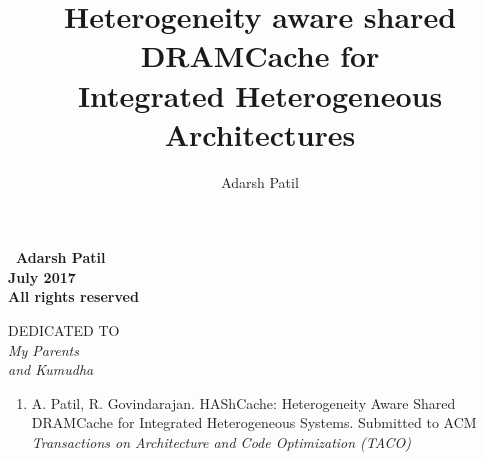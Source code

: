 \documentclass[12pt,twoside,a4paper, openright]{report}
\newcommand{\cachename}{HAShCache}
\begin{document}
\begin{frontmatter}
\title{Heterogeneity aware shared DRAMCache for \\ Integrated Heterogeneous Architectures}
\author{Adarsh Patil}
\enggfaculty
\mscengg
\iisclogotrue %
\figurespagefalse %
\tablespagetrue %
\maketitle

\vspace*{\fill}
\vspace{10em}
\begin{center}
	\Large\bf \textcopyright \ Adarsh Patil\\
	\Large\bf July 2017\\
	\Large\bf All rights reserved
\end{center}
\vspace*{\fill}
\thispagestyle{empty}


\begin{dedication}
\newpage
\vspace*{\fill}
\begin{center}
	DEDICATED TO \\
	\Large\it My Parents  \\
	\Large\it and Kumudha
\end{center}
\vspace*{\fill}
\thispagestyle{empty}
\newpage
\thispagestyle{empty}
\end{dedication}


\acknowledgements
{}



\publications
\begin{enumerate}
	\item A. Patil, R. Govindarajan. \cachename: Heterogeneity Aware Shared DRAMCache for Integrated Heterogeneous Systems. Submitted to ACM \textit{Transactions on Architecture and Code Optimization (TACO)}
\end{enumerate}



\begin{abstract}

\end{abstract}

\makecontents

	
\cleardoublepage
{}
\listoffigures

\newpage
{}
\listofalgorithms
\newpage
\thispagestyle{empty}
\cleardoublepage


\end{frontmatter}
















\end{document}

